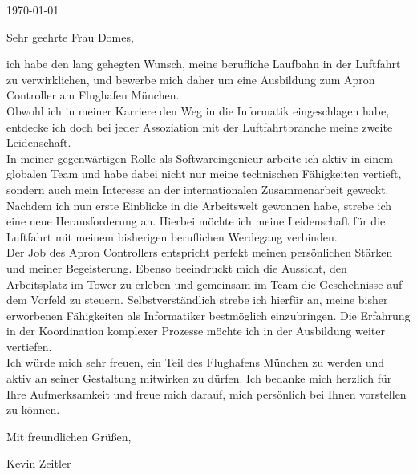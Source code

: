 \documentclass[10pt, a4paper]{article}
\begin{document}
\makeprofile %

\makecontact %

\today %

\makeemployerinfo %

Sehr geehrte Frau Domes,

ich habe den lang gehegten Wunsch, meine berufliche Laufbahn in der Luftfahrt zu verwirklichen,
und bewerbe mich daher um eine Ausbildung zum Apron Controller am Flughafen München.
\\Obwohl ich in meiner Karriere den Weg in die Informatik eingeschlagen habe,
entdecke ich doch bei jeder Assoziation mit der Luftfahrtbranche meine zweite Leidenschaft.
\\In meiner gegenwärtigen Rolle als Softwareingenieur arbeite ich aktiv in einem globalen Team
und habe dabei nicht nur meine technischen Fähigkeiten vertieft, sondern auch mein Interesse an
der internationalen Zusammenarbeit geweckt. Nachdem ich nun erste Einblicke in die Arbeitswelt
gewonnen habe, strebe ich eine neue Herausforderung an. Hierbei möchte ich meine Leidenschaft für
die Luftfahrt mit meinem bisherigen beruflichen Werdegang verbinden.
\\Der Job des Apron Controllers entspricht perfekt meinen persönlichen Stärken und meiner Begeisterung.
Ebenso beeindruckt mich die Aussicht, den Arbeitsplatz im Tower zu erleben und gemeinsam im Team die Geschehnisse auf dem Vorfeld zu steuern.
Selbstverständlich strebe ich hierfür an, meine bisher erworbenen Fähigkeiten als Informatiker bestmöglich einzubringen.
Die Erfahrung in der Koordination komplexer Prozesse möchte ich in der Ausbildung weiter vertiefen.
\\Ich würde mich sehr freuen, ein Teil des Flughafens München zu werden und aktiv an seiner Gestaltung mitwirken zu dürfen.
Ich bedanke mich herzlich für Ihre Aufmerksamkeit und freue mich darauf, mich persönlich bei Ihnen vorstellen zu können.




Mit freundlichen Grüßen,

Kevin Zeitler
\end{document}
